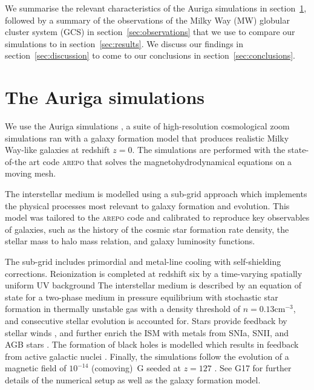 \documentclass[a4paper,fleqn,usenatbib]{mnras}
\begin{document}
We summarise the relevant characteristics of the Auriga simulations in 
section~\ref{sec:auriga}, followed by a summary of the observations of the
Milky Way (MW) globular cluster system (GCS) in section~\ref{sec:observations}
that we use to compare our simulations to in section~\ref{sec:results}. We
discuss our findings in section~\ref{sec:discussion} to come to our conclusions 
in section~\ref{sec:conclusions}.


\section{The Auriga simulations}
\label{sec:auriga}
We use the Auriga simulations \citep[][hereafter G17]{2017MNRAS.467..179G}, a 
suite of high-resolution cosmological zoom simulations ran with a galaxy
formation model that produces realistic Milky Way-like galaxies at redshift
$z=0$. The simulations are performed with the state-of-the art code \textsc{arepo}
\citep{2010MNRAS.401..791S, 2016MNRAS.455.1134P} that solves the 
magnetohydrodynamical equations on a moving mesh.

The interstellar medium is modelled using a sub-grid approach which implements
the physical processes most relevant to galaxy formation and evolution. 
This model was tailored to the \textsc{arepo} code and calibrated to reproduce
key observables of galaxies, such as the history of the cosmic star formation rate 
density, the stellar mass to halo mass relation, and galaxy luminosity functions.

The sub-grid includes primordial and metal-line cooling with self-shielding corrections.
Reionization is completed at redshift six by a time-varying spatially uniform UV 
background \citep{2009ApJ...703.1416F, 2013MNRAS.436.3031V}
The interstellar medium is described by an equation of state for a two-phase medium
in pressure equilibrium \citep{2003MNRAS.339..289S} with stochastic star formation
in thermally unstable gas with a density threshold of $n = 0.13 \text{cm}^{-3}$,
and consecutive stellar evolution is accounted for. Stars provide feedback by 
stellar winds \citep{2014MNRAS.437.1750M, 2017MNRAS.467..179G}, and further 
enrich the ISM with metals from SNIa, SNII, and AGB stars \citep{2013MNRAS.436.3031V}.
The formation of black holes is modelled which results in feedback from active 
galactic nuclei \citep{2005MNRAS.361..776S, 2014MNRAS.437.1750M, 2017MNRAS.467..179G}.
Finally, the simulations follow the evolution of a magnetic field of $10^{-14}$
(comoving)~G seeded at $z = 127$ \citep{2013MNRAS.432..176P, 2014ApJ...783L..20P}.
See G17 for further details of the numerical setup as well as the galaxy formation
model.
\end{document}
